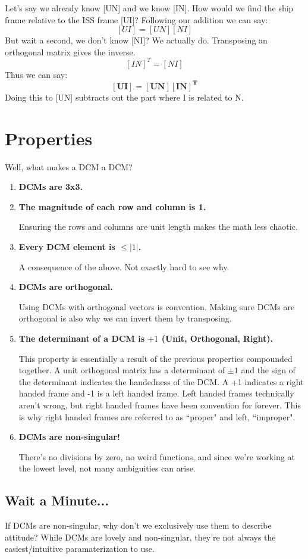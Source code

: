 \documentclass[a4paper,14pt]{extreport}
\begin{document}
Let's say we already know [UN] and we know [IN]. How would we find the ship frame relative to the ISS frame [UI]? Following our addition we can say:
\[[UI] = [UN][NI]\]
But wait a second, we don't know [NI]? We actually do. Transposing an orthogonal matrix gives the inverse.
\[[IN]^T = [NI]\]
Thus we can say:
\[\bm{[UI] = [UN][IN]^T}\]
Doing this to [UN] subtracts out the part where I is related to N.
\section{Properties}
Well, what makes a DCM a DCM?
\begin{enumerate}
\item{\textbf{DCMs are 3x3.}}

\item{\textbf{The magnitude of each row and column is 1.}}

Ensuring the rows and columns are unit length makes the math less chaotic.

\item{\textbf{Every DCM element is $\leq |1|$.}}

A consequence of the above. Not exactly hard to see why.

\item{\textbf{DCMs are orthogonal.}}

Using DCMs with orthogonal vectors is convention. Making sure DCMs are orthogonal is also why we can invert them by transposing.

\item{\textbf{The determinant of a DCM is $+1$ (Unit, Orthogonal, Right).}}

This property is essentially a result of the previous properties compounded together. A unit orthogonal matrix has a determinant of $\pm 1$ and the sign of the determinant indicates the handedness of the DCM. A +1 indicates a right handed frame and -1 is a left handed frame. Left handed frames technically aren't wrong, but right handed frames have been convention for forever. This is why right handed frames are referred to as ``proper" and left, ``improper".

\item{\textbf{DCMs are non-singular!}}

There's no divisions by zero, no weird functions, and since we're working at the lowest level, not many ambiguities can arise.
\end{enumerate}

\subsection{Wait a Minute...}
If DCMs are non-singular, why don't we exclusively use them to describe attitude? While DCMs are lovely and non-singular, they're not always the easiest/intuitive paramaterization to use. 
\end{document}
